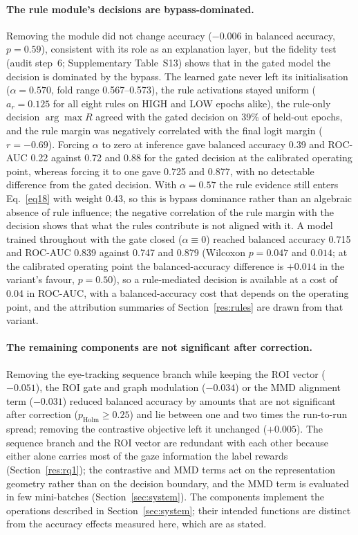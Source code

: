 \documentclass[pdflatex,sn-basic,Numbered,twocolumn,iicol]{sn-jnl}
\theoremstyle{thmstyleone}%
\theoremstyle{thmstyletwo}%
\theoremstyle{thmstylethree}%
\begin{document}
\paragraph{The rule module's decisions are bypass-dominated.} Removing the module did not change accuracy ($-0.006$ in balanced accuracy, $p=0.59$), consistent with its role as an explanation layer, but the fidelity test (audit step~6; Supplementary Table~S13) shows that in the gated model the decision is dominated by the bypass. The learned gate never left its initialisation ($\alpha=0.570$, fold range 0.567--0.573), the rule activations stayed uniform ($a_r=0.125$ for all eight rules on HIGH and LOW epochs alike), the rule-only decision $\arg\max R$ agreed with the gated decision on 39\% of held-out epochs, and the rule margin was negatively correlated with the final logit margin ($r=-0.69$). Forcing $\alpha$ to zero at inference gave balanced accuracy 0.39 and ROC-AUC 0.22 against 0.72 and 0.88 for the gated decision at the calibrated operating point, whereas forcing it to one gave 0.725 and 0.877, with no detectable difference from the gated decision. With $\alpha=0.57$ the rule evidence still enters Eq.~\eqref{eq18} with weight 0.43, so this is bypass dominance rather than an algebraic absence of rule influence; the negative correlation of the rule margin with the decision shows that what the rules contribute is not aligned with it. A model trained throughout with the gate closed ($\alpha\equiv0$) reached balanced accuracy 0.715 and ROC-AUC 0.839 against 0.747 and 0.879 (Wilcoxon $p=0.047$ and $0.014$; at the calibrated operating point the balanced-accuracy difference is $+0.014$ in the variant's favour, $p=0.50$), so a rule-mediated decision is available at a cost of 0.04 in ROC-AUC, with a balanced-accuracy cost that depends on the operating point, and the attribution summaries of Section~\ref{res:rules} are drawn from that variant.

\paragraph{The remaining components are not significant after correction.} Removing the eye-tracking sequence branch while keeping the ROI vector ($-0.051$), the ROI gate and graph modulation ($-0.034$) or the MMD alignment term ($-0.031$) reduced balanced accuracy by amounts that are not significant after correction ($p_{\mathrm{Holm}}\ge0.25$) and lie between one and two times the run-to-run spread; removing the contrastive objective left it unchanged ($+0.005$). The sequence branch and the ROI vector are redundant with each other because either alone carries most of the gaze information the label rewards (Section~\ref{res:rq1}); the contrastive and MMD terms act on the representation geometry rather than on the decision boundary, and the MMD term is evaluated in few mini-batches (Section~\ref{sec:system}). The components implement the operations described in Section~\ref{sec:system}; their intended functions are distinct from the accuracy effects measured here, which are as stated.
\end{document}
